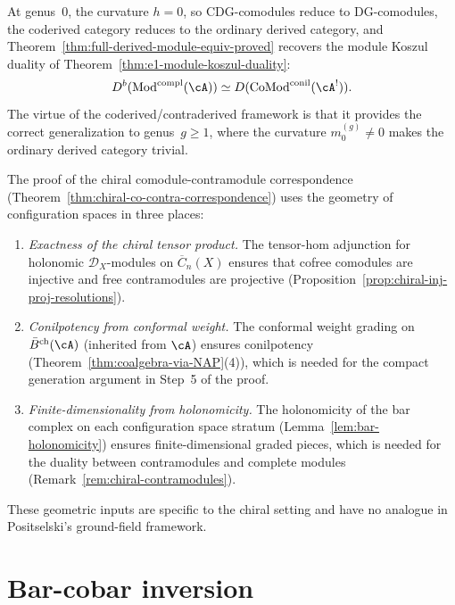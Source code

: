 \begin{remark}
\label{rem:genus-0-recovery}
At genus~$0$, the curvature $h = 0$, so CDG-comodules reduce to
DG-comodules, the coderived category reduces to the ordinary derived
category, and Theorem~\ref{thm:full-derived-module-equiv-proved}
recovers the module Koszul duality of
Theorem~\ref{thm:e1-module-koszul-duality}:
\[
D^b(\mathrm{Mod}^{\mathrm{compl}}(\cA))
\simeq D(\mathrm{CoMod}^{\mathrm{conil}}(\cA^!)).
\]
The virtue of the coderived/contraderived framework is that it
provides the correct generalization to genus~$g \geq 1$, where the
curvature $m_0^{(g)} \neq 0$ makes the ordinary derived category
trivial.
\end{remark}

\begin{remark}
\label{rem:config-space-role}
The proof of the chiral comodule-contramodule correspondence
(Theorem~\ref{thm:chiral-co-contra-correspondence}) uses the
geometry of configuration spaces in three places:
\begin{enumerate}
\item \emph{Exactness of the chiral tensor product.}
  The tensor-hom adjunction for holonomic $\mathcal{D}_X$-modules
  on $\overline{C}_n(X)$ ensures that cofree comodules are injective
  and free contramodules are projective
  (Proposition~\ref{prop:chiral-inj-proj-resolutions}).
\item \emph{Conilpotency from conformal weight.}
  The conformal weight grading on $\bar{B}^{\mathrm{ch}}(\cA)$
  (inherited from $\cA$) ensures conilpotency
  (Theorem~\ref{thm:coalgebra-via-NAP}(4)), which is needed for
  the compact generation argument in Step~5 of the proof.
\item \emph{Finite-dimensionality from holonomicity.}
  The holonomicity of the bar complex on each configuration space
  stratum (Lemma~\ref{lem:bar-holonomicity}) ensures
  finite-dimensional graded pieces, which is
  needed for the duality between contramodules and complete modules
  (Remark~\ref{rem:chiral-contramodules}).
\end{enumerate}
These geometric inputs are specific to the chiral setting and have
no analogue in Positselski's ground-field framework.
\end{remark}


\section{Bar-cobar inversion}
\label{sec:bar-cobar-inversion-quasi-iso}

